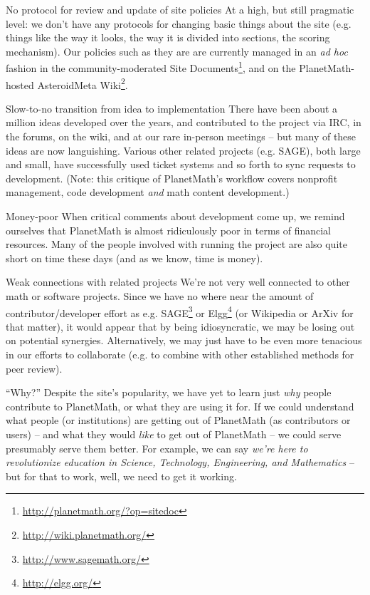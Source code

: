 \begin{paragraph}{No protocol for review and update of site policies}
At a high, but still pragmatic level: we don't have any
protocols for changing basic things about the site (e.g.
things like the way it looks, the way it is divided into
sections, the scoring mechanism). Our policies such as
they are are currently managed in an \emph{ad hoc} fashion
in the community-moderated Site
Documents\footnote{\url{http://planetmath.org/?op=sitedoc}},
and on the PlanetMath-hosted AsteroidMeta
Wiki\footnote{\url{http://wiki.planetmath.org/}}.
\end{paragraph}

\begin{paragraph}{Slow-to-no transition from idea to implementation}
There have been about a million ideas developed over the
years, and contributed to the project via IRC, in the
forums, on the wiki, and at our rare in-person meetings --
but many of these ideas are now languishing.  Various
other related projects (e.g. SAGE), both large and small,
have successfully used ticket systems and so forth to sync
requests to development.  (Note: this critique of
PlanetMath's workflow covers nonprofit management, code
development \emph{and} math content development.)
\end{paragraph}

\begin{paragraph}{Money-poor}
When critical comments about development come up, we
remind ourselves that PlanetMath is almost ridiculously
poor in terms of financial resources.  Many of the people
involved with running the project are also quite short on
time these days (and as we know, time is money).
\end{paragraph}

\begin{paragraph}{Weak connections with related projects}
We're not very well connected to other math or software
projects.  Since we have no where near the amount of
contributor/developer effort as
e.g. SAGE\footnote{\url{http://www.sagemath.org/}} or
Elgg\footnote{\url{http://elgg.org/}} (or Wikipedia or
ArXiv for that matter), it would appear that by being
idiosyncratic, we may be losing out on potential
synergies.  Alternatively, we may just have to be even
more tenacious in our efforts to collaborate (e.g. to
combine with other established methods for peer review).
\end{paragraph}

\begin{paragraph}{``Why?''}
Despite the site's popularity, we have yet to learn just
\emph{why} people contribute to PlanetMath, or what they
are using it for.  If we could understand what people (or
institutions) are getting out of PlanetMath (as
contributors or users) -- and what they would \emph{like}
to get out of PlanetMath -- we could serve presumably
serve them better.  For example, we can say \emph{we're
  here to revolutionize education in Science, Technology,
  Engineering, and Mathematics} -- but for that to work,
well, we need to get it working.
\end{paragraph}


